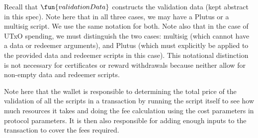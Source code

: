 Recall that $\fun{validationData}$ constructs the validation data (kept abstract
in this spec).
Note here that in all three cases, we may have a Plutus or a multisig script.
We use the same notation for both. Note also that in the case of UTxO
spending, we must distinguish the two cases: multisig (which cannot
have a data or redeemer arguments), and Plutus (which must explicitly be
applied to the provided data and redeemer scripts in this case).
This notational distinction is not necessary for certificates or reward withdrawals
because neither allow for non-empty data and redeemer scripts.

Note here that the wallet is responsible to determining the total price of the
validation of all the scripts in a transaction
by running the script itself to see how much resources it takes and doing the
fee calculation using the cost parameters in protocol parameters. It is then
also responsible for adding enough inputs to the transaction to cover the
fees required.

